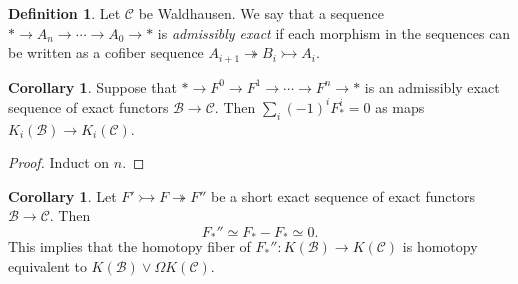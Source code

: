 \documentclass[10pt,letterpaper,cm]{nupset}
\theoremstyle{definition}
\newtheorem{definition}{Definition}
\theoremstyle{theorem}
\newtheorem{corollary}[theorem]{Corollary}
\theoremstyle{remark}
\newcommand{\1}{\mathbf{1}}
\renewcommand{\b}{\mathscr{B}}
\renewcommand{\c}{\mathscr{C}}
\newcommand{\0}{\vec 0}
\begin{document}
\begin{definition}
Let $\c$ be Waldhausen. We say that a sequence $\ast \to A_n \to \cdots \to A_0 \to \ast$ is \textit{admissibly exact} if each morphism in the sequences can be written as a cofiber sequence $A_{i+1} \twoheadrightarrow B_i \rightarrowtail A_i$. 
\end{definition}

\begin{corollary}
Suppose that $\ast \to F^0 \to F^1 \to \cdots \to F^n \to \ast$ is an admissibly exact sequence of exact functors $\b \to \c$. Then $\sum_i (-1)^iF_{\ast}^i = 0$ as maps $K_i(\b) \to K_i(\c)$.
\end{corollary}
\begin{proof}
Induct on $n$.
\end{proof}

\begin{corollary}
Let $F' \rightarrowtail F \twoheadrightarrow F''$ be a short exact sequence of exact functors $\b \to \c$. Then $$F_{\ast}'' \simeq F_{\ast} - F_{\ast} \simeq 0.$$ This implies that the homotopy fiber of $F_{\ast}'' : K(\b) \to K(\c)$ is homotopy equivalent to $K(\b) \vee \Omega K(\c)$.
\end{corollary}
\end{document}
